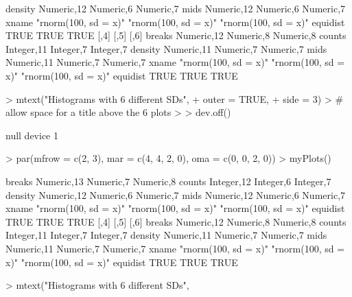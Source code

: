 \documentclass[12pt,letterpaper,final]{article}
\begin{document}
\begin{Schunk}
\begin{Soutput}
density  Numeric,12           Numeric,6            Numeric,7           
mids     Numeric,12           Numeric,6            Numeric,7           
xname    "rnorm(100, sd = x)" "rnorm(100, sd = x)" "rnorm(100, sd = x)"
equidist TRUE                 TRUE                 TRUE                
         [,4]                 [,5]                 [,6]                
breaks   Numeric,12           Numeric,8            Numeric,8           
counts   Integer,11           Integer,7            Integer,7           
density  Numeric,11           Numeric,7            Numeric,7           
mids     Numeric,11           Numeric,7            Numeric,7           
xname    "rnorm(100, sd = x)" "rnorm(100, sd = x)" "rnorm(100, sd = x)"
equidist TRUE                 TRUE                 TRUE                
\end{Soutput}
\begin{Sinput}
> mtext("Histograms with 6 different SDs", 
+       outer = TRUE,
+       side = 3)
> # allow space for a title above the 6 plots
> 
> dev.off()
\end{Sinput}
\begin{Soutput}
null device 
          1 
\end{Soutput}
\begin{Sinput}
> par(mfrow = c(2, 3), mar = c(4, 4, 2, 0), oma = c(0, 0, 2, 0))
> myPlots()
\end{Sinput}
\begin{Soutput}
         [,1]                 [,2]                 [,3]                
breaks   Numeric,13           Numeric,7            Numeric,8           
counts   Integer,12           Integer,6            Integer,7           
density  Numeric,12           Numeric,6            Numeric,7           
mids     Numeric,12           Numeric,6            Numeric,7           
xname    "rnorm(100, sd = x)" "rnorm(100, sd = x)" "rnorm(100, sd = x)"
equidist TRUE                 TRUE                 TRUE                
         [,4]                 [,5]                 [,6]                
breaks   Numeric,12           Numeric,8            Numeric,8           
counts   Integer,11           Integer,7            Integer,7           
density  Numeric,11           Numeric,7            Numeric,7           
mids     Numeric,11           Numeric,7            Numeric,7           
xname    "rnorm(100, sd = x)" "rnorm(100, sd = x)" "rnorm(100, sd = x)"
equidist TRUE                 TRUE                 TRUE                
\end{Soutput}
\begin{Sinput}
> mtext("Histograms with 6 different SDs", 

\end{Sinput}
\end{Schunk}
\end{document}
